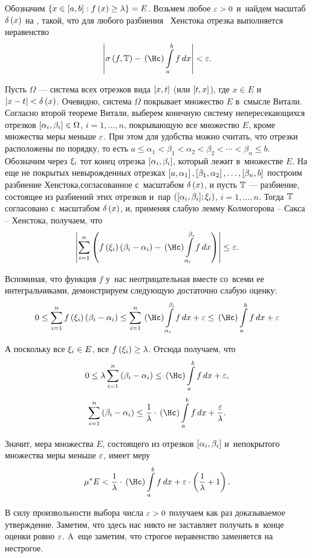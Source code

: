 \documentclass[draft]{article}
\begin{document}
\pr

Обозначим $\set{x\in\segab: f\atx \ge \lambda}=E$. Возьмем любое
$\varepsilon > 0$ и~найдем масштаб $\dex$ на \ab, такой, что для любого
разбиения \Tdixif\ Хенстока отрезка \ab выполняется неравенство
$$\abs{\isfT-\kurzh\intabfdx}<\ep.$$

Пусть $\Omega$ --- система всех отрезков вида $\seg[x,t]$ (или
$\seg[t,x]$), где $x\in E$ и~$\abs{x-t}<\dex$. Очевидно, система
$\Omega$ покрывает множество $E$ в~смысле Витали. Согласно второй
теореме Витали, выберем конечную систему непересекающихся отрезков
$\seg[\alpha_i,\beta_i]\in\Omega$, $i=1,\dots,n$, покрывающую все
множество $E$, кроме множества меры меньше $\varepsilon$. При этом для
удобства можно считать, что отрезки расположены по порядку, то есть
$a \le \alpha_1 < \beta_1 < \alpha_2 < \beta_2 < \cdots
 < \beta_n \le b$. Обозначим через $\xi_i$ тот конец отрезка
$\seg[\alpha_i,\beta_i]$, который лежит в~множестве $E$. На еще не
покрытых невырожденных отрезках
$\seg[a,\alpha_1],\seg[\beta_1,\alpha_2],\dots,\seg[\beta_n,b]$
построим разбиение Хенстока,согласованное с~масштабом $\dex$, и
пусть $\mathbb{T}$ --- разбиение, состоящее из разбиений этих отрезков и~пар
$\pair(\seg[\alpha_i,\beta_i];\xii)$, $i=1,\dots,n$. Тогда $\mathbb{T}$
согласовано с~масштабом $\dex$, и, применяя слабую лемму Колмогорова
-- Сакса -- Хенстока, получаем, что
$$\abs{\sum_{i=1}^n\at({f\at(\xii)\at(\beta_i - \alpha_i)-
\kurzh\intd[\alpha_i,\beta_i]f,x})}\le\ep.$$

Вспоминая, что функция $f$ у~нас неотрицательная вместе со~всеми ее
интегральчиками, демонстрируем следующую достаточно слабую оценку:
$$0\le\sum_{i=1}^n f\at(\xii)\at(\beta_i - \alpha_i)\le
\sum_{i=1}^n\kurzh\intd[\alpha_i,\beta_i]f,x+\ep\le\kurzh\intabfdx+\ep$$

А поскольку все $\xi_i\in E$, все $f\at(\xii)\ge\lambda$. Отсюда
получаем, что
$$0\le\lambda\sum_{i=1}^n\at(\beta_i - \alpha_i)\le\kurzh\intabfdx+\ep,$$
$$\sum_{i=1}^n\at(\beta_i - \alpha_i)\le
{1\over\lambda}\cdot\kurzh\intabfdx+{\ep\over\lambda}.$$

Значит, мера множества $E$, состоящего из отрезков
$\seg[\alpha_i,\beta_i]$ и~непокрытого множества меры меньше $\varepsilon$,
имеет меру
$$\mes E<{1\over\lambda}\cdot\kurzh\intabfdx+
\ep\cdot\at({1\over\lambda}+1).$$

В силу произвольности выбора числа $\varepsilon > 0$ получаем как раз
доказываемое утверждение. Заметим, что здесь нас никто не заставляет
получать в~конце оценки ровно $\varepsilon$. A~еще заметим, что строгое
неравенство заменяется на нестрогое.
\end{document}
